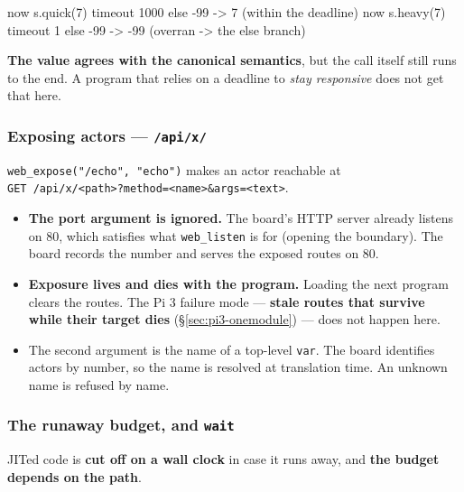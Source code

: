 \documentclass[11pt,a4paper]{article}
\begin{document}
\begin{term}
now s.quick(7) timeout 1000 else -99   ->   7     (within the deadline)
now s.heavy(7) timeout    1 else -99   -> -99     (overran -> the else branch)
\end{term}

\textbf{The value agrees with the canonical semantics}, but the call itself
still runs to the end. A program that relies on a deadline to \emph{stay
responsive} does not get that here.

\subsubsection*{Exposing actors --- \texttt{/api/x/}}

\texttt{web\_expose("/echo", "echo")} makes an actor reachable at\\
\texttt{GET /api/x/<path>?method=<name>\&args=<text>}.


\begin{itemize}
\item \textbf{The port argument is ignored.} The board's HTTP server already
  listens on 80, which satisfies what \texttt{web\_listen} is for (opening the
  boundary). The board records the number and serves the exposed routes on 80.
\item \textbf{Exposure lives and dies with the program.} Loading the next
  program clears the routes. The Pi 3 failure mode --- \textbf{stale routes
  that survive while their target dies} (\S\ref{sec:pi3-onemodule}) --- does
  not happen here.
\item The second argument is the name of a top-level \texttt{var}. The board
  identifies actors by number, so the name is resolved at translation time.
  An unknown name is refused by name.
\end{itemize}

\subsubsection*{The runaway budget, and \texttt{wait}}
\label{sec:pi5-budget}

JITed code is \textbf{cut off on a wall clock} in case it runs away, and
\textbf{the budget depends on the path}.
\end{document}
